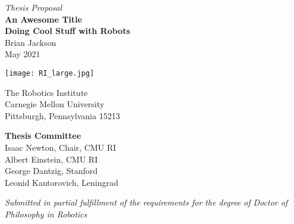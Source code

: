 \begin{titlepage}
    \begin{center}
        \vspace*{1.0in}
        {\LARGE \textit{Thesis Proposal}\\}
        \vspace{0.2in}
        {\Huge \textbf{
            An Awesome Title \\
            Doing Cool Stuff with Robots
        }} \\
        \vspace{0.2in}
        {\Large Brian Jackson} \\
        \vspace{0.2in}
        {\large May 2021}
        
        \vfill
        \texttt{[image: RI\_large.jpg]}

        The Robotics Institute \\
        Carnegie Mellon University \\
        Pittsburgh, Pennsylvania 15213 \\

        \vspace{0.2in}

        \textbf{Thesis Committee} \\
        Isaac Newton, Chair, CMU RI \\
        Albert Einstein, CMU RI \\
        George Dantzig, Stanford \\
        Leonid Kantorovich, Leningrad \\

        \vspace*{0.5in}

        \textit{Submitted in partial fulfillment of the requirements for the degree of Doctor of Philosophy in Robotics }\\

    \end{center}
\end{titlepage}